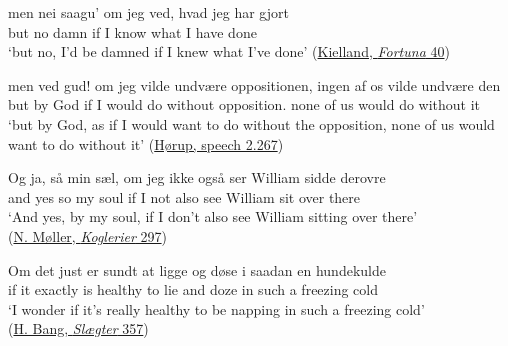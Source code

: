 \ex
\gll men nei saagu' om jeg ved, hvad jeg har gjort\\
 but no damn if I know what I have done\\
\glt `but no, I'd be damned if I knew what I've done'
\hfill(\href{https://books.google.co.jp/books?id=FrQNAAAAYAAJ&newbks=1&newbks_redir=0&printsec=frontcover&redir_esc=y#v=onepage&q=\%22hvad%20jeg%20har%20gjort\%22&f=false}{Kielland, \textit{Fortuna} 40})

\ex{}
\gll men ved gud! om jeg vilde undvære oppositionen, ingen af os vilde undvære den\\
 but by God if I would {do without} opposition.\DEF{} none of us would {do without} it\\
\glt `but by God, as if I would want to do without the opposition, none of us would want to do without it'
\hfill(\href{https://www.dansketaler.dk/tale/viggo-hoerups-grundlovstale-1889}{Hørup, speech 2.267})


\ex{}
\gll Og ja, så min sæl, om jeg ikke også ser William sidde derovre\\
 and yes so my soul if I not also see William sit {over there}\\
\glt `And yes, by my soul, if I don't also see William sitting over there'\\
\hfill(\href{https://books.google.co.jp/books?id=7X0_AAAAIAAJ&newbks=1&newbks_redir=0&printsec=frontcover&dq=Niels+M%C3%B8ller.+Koglerier&hl=ja&redir_esc=y#v=onepage&q=\%22ser%20William%20sidde%20derovre\%22&f=false}{N. Møller, \textit{Koglerier} 297}) %

\ex
\gll Om det just er sundt at ligge og døse i saadan en hundekulde\\
 if it exactly is healthy to lie and doze in such a {freezing cold}\\
\glt `I wonder if it's really healthy to be napping in such a freezing cold'\\
\hfill(\href{https://books.google.com/books?id=RvQNAAAAYAAJ&printsec=frontcover&dq=herman+bang+h%C3%A5bl%C3%B8se+sl%C3%A6gter&hl=en&newbks=1&newbks_redir=0&sa=X&redir_esc=y#v=onepage&q=herman%20bang%20h%C3%A5bl%C3%B8se%20sl%C3%A6gter&f=false}{H. Bang, \textit{Slægter} 357})
\z
\z

